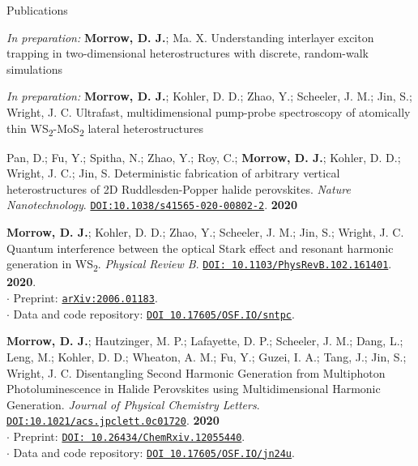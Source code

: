 \documentclass{resume} %
\begin{document}
\begin{rSection}{Publications}
	
\begin{etaremune}

	
\item[] \textit{In preparation:} \textbf{Morrow, D. J.}; Ma. X. Understanding interlayer exciton trapping in two-dimensional heterostructures with discrete, random-walk simulations
	
\item[] \textit{In preparation:} \textbf{Morrow, D. J.}; Kohler, D. D.; Zhao, Y.; Scheeler, J. M.; Jin, S.; Wright, J. C. Ultrafast, multidimensional pump-probe spectroscopy of atomically thin WS\textsubscript{2}-MoS\textsubscript{2} lateral heterostructures
	


\item  Pan, D.; Fu, Y.; Spitha, N.; Zhao, Y.; Roy, C.; \textbf{Morrow, D. J.};  Kohler, D. D.;  Wright, J. C.; Jin, S. Deterministic fabrication of arbitrary vertical heterostructures of 2D Ruddlesden-Popper halide perovskites.  \emph{Nature Nanotechnology}. \href{https://doi.org/10.1038/s41565-020-00802-2}{\texttt{DOI:10.1038/s41565-020-00802-2}}. \textbf{2020}

\item \textbf{Morrow, D. J.}; Kohler, D. D.; Zhao, Y.; Scheeler, J. M.; Jin, S.; Wright, J. C.	Quantum interference between the optical Stark effect and resonant harmonic generation in WS\textsubscript{2}.  \emph{Physical Review B}. \href{https://journals.aps.org/pra/abstract/10.1103/PhysRevB.102.161401}{\texttt{DOI: 10.1103/PhysRevB.102.161401}}. \textbf{2020}.\\
$\cdot$ Preprint: \href{http://arxiv.org/abs/2006.01183}{\texttt{arXiv:2006.01183}}. \\
$\cdot$ Data and code repository: \href{https://osf.io/sntpc/}{\texttt{DOI 10.17605/OSF.IO/sntpc}}.

\item \textbf{Morrow, D. J.}; Hautzinger, M. P.; Lafayette, D. P.; Scheeler, J. M.; Dang, L.; Leng, M.; Kohler, D. D.; Wheaton, A. M.; Fu, Y.; Guzei, I. A.; Tang, J.; Jin, S.; Wright, J. C. Disentangling Second Harmonic Generation from Multiphoton Photoluminescence in Halide Perovskites using Multidimensional Harmonic Generation. \emph{Journal of Physical Chemistry Letters}. \href{https://pubs.acs.org/doi/10.1021/acs.jpclett.0c01720}{\texttt{DOI:10.1021/acs.jpclett.0c01720}}. \textbf{2020} \\
$\cdot$ Preprint: \href{https://dx.doi.org/10.26434/chemrxiv.12055440}{\texttt{DOI: 10.26434/ChemRxiv.12055440}}. \\
$\cdot$ Data and code repository: \href{https://osf.io/jn24u/}{\texttt{DOI 10.17605/OSF.IO/jn24u}}.


\end{etaremune}
\end{rSection}
\end{document}
